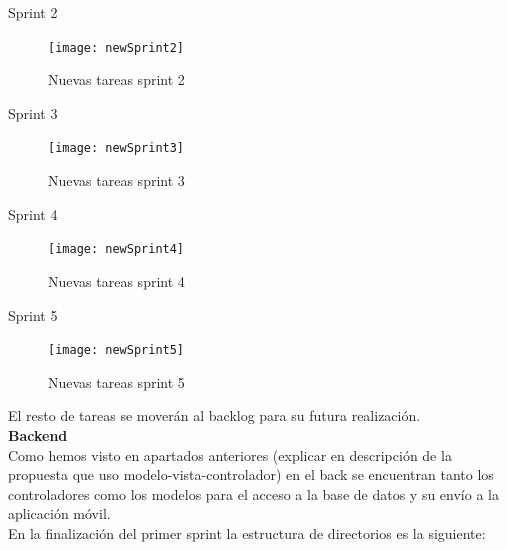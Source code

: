 Sprint 2 \\
\begin{figure}[H]
	\centering
	\texttt{[image: newSprint2]}
	\caption{Nuevas tareas sprint 2}
	\label{fig:newsprint2}
\end{figure}


Sprint 3 \\
\begin{figure}[H]
	\centering
	\texttt{[image: newSprint3]}
	\caption{Nuevas tareas sprint 3}
	\label{fig:newsprint3}
\end{figure}

Sprint 4 \\
\begin{figure}[H]
	\centering
	\texttt{[image: newSprint4]}
	\caption{Nuevas tareas sprint 4}
	\label{fig:newsprint4}
\end{figure}


Sprint 5 \\ 
\begin{figure}[H]
	\centering
	\texttt{[image: newSprint5]}
	\caption{Nuevas tareas sprint 5}
	\label{fig:newsprint5}
\end{figure}

El resto de tareas se moverán al backlog para su futura realización. \\ 

\textbf{Backend} \\

Como hemos visto en apartados anteriores (explicar en descripción de la propuesta que uso modelo-vista-controlador) en el back se encuentran tanto los controladores como los modelos para el acceso a la base de datos y su envío a la aplicación móvil. \\

En la finalización del primer sprint la estructura de directorios es la siguiente:

